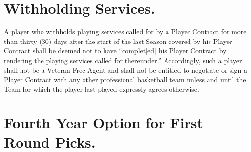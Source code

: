 \documentclass[
]{book}
\begin{document}
\hypertarget{withholding-services.}{%
\section{Withholding Services.}\label{withholding-services.}}

A player who withholds playing services called for by a Player Contract for more than thirty (30) days after the start of the last Season covered by his Player Contract shall be deemed not to have ``complet{[}ed{]} his Player Contract by rendering the playing services called for thereunder.'' Accordingly, such a player shall not be a Veteran Free Agent and shall not be entitled to negotiate or sign a Player Contract with any other professional basketball team unless and until the Team for which the player last played expressly agrees otherwise.

\hypertarget{fourth-year-option-for-first-round-picks.}{%
\section{Fourth Year Option for First Round Picks.}\label{fourth-year-option-for-first-round-picks.}}
\end{document}
